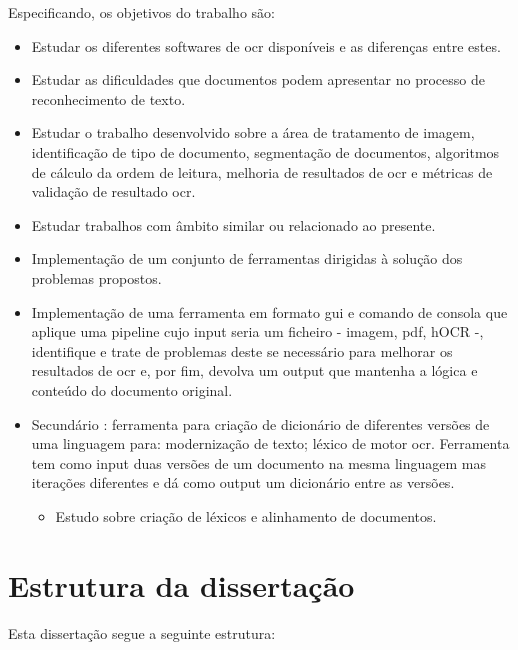 Especificando, os objetivos do trabalho são:
\begin{itemize}
    \item Estudar os diferentes softwares de \acrshort{ocr} disponíveis e as diferenças entre estes.
    \item Estudar as dificuldades que documentos podem apresentar no processo de reconhecimento de texto.
    \item Estudar o trabalho desenvolvido sobre a área de tratamento de imagem, identificação de tipo de documento, segmentação de documentos, algoritmos de cálculo da ordem de leitura, melhoria de resultados de \acrshort{ocr} e métricas de validação de resultado \acrshort{ocr}.
    \item Estudar trabalhos com âmbito similar ou relacionado ao presente.
    \item Implementação de um conjunto de ferramentas dirigidas à solução dos problemas propostos.
    \item Implementação de uma ferramenta em formato \acrshort{gui} e comando de consola que aplique uma pipeline cujo input seria um ficheiro - imagem, pdf, hOCR -, identifique e trate de problemas deste se necessário para melhorar os resultados de \acrshort{ocr} e, por fim, devolva um output que mantenha a lógica e conteúdo do documento original.
    \item Secundário : ferramenta para criação de dicionário de diferentes versões de uma linguagem para: modernização de texto; léxico de motor \acrshort{ocr}. Ferramenta tem como input duas versões de um documento na mesma linguagem mas iterações diferentes e dá como output um dicionário entre as versões.
    \begin{itemize}
        \item Estudo sobre criação de léxicos e alinhamento de documentos.
    \end{itemize}
\end{itemize}



\section{Estrutura da dissertação}

Esta dissertação segue a seguinte estrutura:

